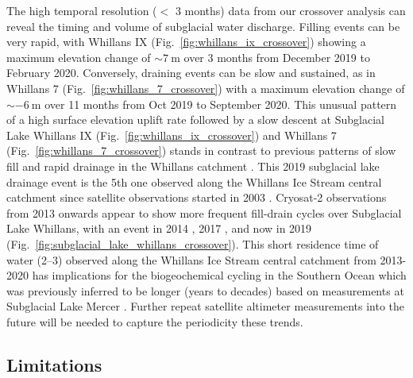The high temporal resolution ($<$ 3 months) data from our crossover analysis can reveal the timing and volume of subglacial water discharge. %
Filling events can be very rapid, with Whillans IX (Fig.~\ref{fig:whillans_ix_crossover}) showing a maximum elevation change of $\sim\SI{+7}{\metre}$ over 3 months from December 2019 to February 2020.
Conversely, draining events can be slow and sustained, as in Whillans 7 (Fig.~\ref{fig:whillans_7_crossover}) with a maximum elevation change of $\sim\SI{-6}{\metre}$ over 11 months from Oct 2019 to September 2020.
This unusual pattern of a high surface elevation uplift rate followed by a slow descent at Subglacial Lake Whillans IX (Fig.~\ref{fig:whillans_ix_crossover}) and Whillans 7 (Fig.~\ref{fig:whillans_7_crossover}) stands in contrast to previous patterns of slow fill and rapid drainage in the Whillans catchment \citep[e.g.][]{SiegfriedEpisodicicevelocity2016,SiegfriedThirteenyearssubglacial2018}.
This 2019 subglacial lake drainage event is the 5th one observed along the Whillans Ice Stream central catchment since satellite observations started in 2003 \citep{SiegfriedThirteenyearssubglacial2018}.
Cryosat-2 observations from 2013 onwards appear to show more frequent fill-drain cycles over Subglacial Lake Whillans, with an event in 2014 \citep{SiegfriedEpisodicicevelocity2016}, 2017 \citep{SiegfriedThirteenyearssubglacial2018}, and now in 2019 (Fig.~\ref{fig:subglacial_lake_whillans_crossover}).
This short residence time of water (\SIrange{2}{3}{\year}) observed along the Whillans Ice Stream central catchment from 2013-2020 has implications for the biogeochemical cycling in the Southern Ocean which was previously inferred to be longer (years to decades) based on measurements at Subglacial Lake Mercer \citep{Vick-MajorsBiogeochemicalConnectivityFreshwater2020,HawkingsEnhancedtraceelement2020}.
Further repeat satellite altimeter measurements into the future \citep[e.g. CRISTAL;][]{KernCopernicusPolarIce2020} will be needed to capture the periodicity these trends.



\subsection{Limitations}

